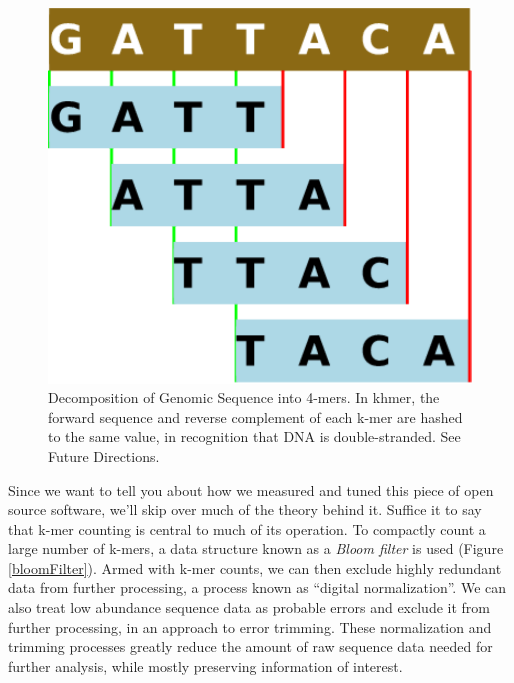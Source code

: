 \documentclass{article}
\begin{document}
\begin{figure}[ht!]
\centering
\includegraphics[scale=0.5]{kmers.pdf}
\caption{Decomposition of Genomic Sequence into 4-mers.  In khmer, the forward sequence and reverse complement of each k-mer are hashed to the same value, in recognition that DNA is double-stranded.  See Future Directions.}
\label{kmers}
\end{figure}


Since we want to tell you about how we measured and tuned this piece of open
source software, we'll skip over much of the theory behind it. Suffice it to
say that k-mer counting is central to much of its operation. To compactly count
a large number of k-mers, a data structure known as a \textit{Bloom filter}
\citep{web:BloomFilter} is used (Figure \ref{bloomFilter}). Armed with k-mer counts, we can then exclude
highly redundant data from further processing, a process known as
``digital normalization''. We can also treat low
abundance sequence data as probable errors and exclude it from further
processing, in an approach to error trimming.  These normalization and
trimming processes greatly reduce
the amount of raw sequence data needed for further analysis, while mostly
preserving information of interest.
\end{document}
